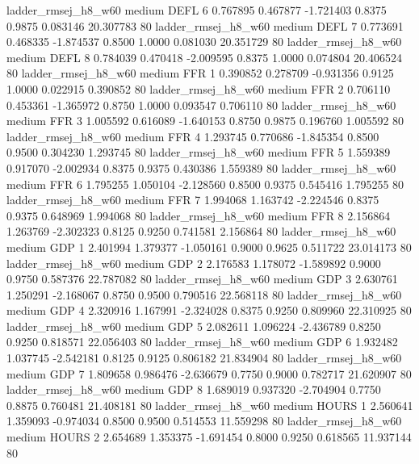    ladder_rmsej_h8_w60     medium     DEFL                 6  0.767895 0.467877 -1.721403 0.8375 0.9875  0.083146   20.307783 80
   ladder_rmsej_h8_w60     medium     DEFL                 7  0.773691 0.468335 -1.874537 0.8500 1.0000  0.081030   20.351729 80
   ladder_rmsej_h8_w60     medium     DEFL                 8  0.784039 0.470418 -2.009595 0.8375 1.0000  0.074804   20.406524 80
   ladder_rmsej_h8_w60     medium      FFR                 1  0.390852 0.278709 -0.931356 0.9125 1.0000  0.022915    0.390852 80
   ladder_rmsej_h8_w60     medium      FFR                 2  0.706110 0.453361 -1.365972 0.8750 1.0000  0.093547    0.706110 80
   ladder_rmsej_h8_w60     medium      FFR                 3  1.005592 0.616089 -1.640153 0.8750 0.9875  0.196760    1.005592 80
   ladder_rmsej_h8_w60     medium      FFR                 4  1.293745 0.770686 -1.845354 0.8500 0.9500  0.304230    1.293745 80
   ladder_rmsej_h8_w60     medium      FFR                 5  1.559389 0.917070 -2.002934 0.8375 0.9375  0.430386    1.559389 80
   ladder_rmsej_h8_w60     medium      FFR                 6  1.795255 1.050104 -2.128560 0.8500 0.9375  0.545416    1.795255 80
   ladder_rmsej_h8_w60     medium      FFR                 7  1.994068 1.163742 -2.224546 0.8375 0.9375  0.648969    1.994068 80
   ladder_rmsej_h8_w60     medium      FFR                 8  2.156864 1.263769 -2.302323 0.8125 0.9250  0.741581    2.156864 80
   ladder_rmsej_h8_w60     medium      GDP                 1  2.401994 1.379377 -1.050161 0.9000 0.9625  0.511722   23.014173 80
   ladder_rmsej_h8_w60     medium      GDP                 2  2.176583 1.178072 -1.589892 0.9000 0.9750  0.587376   22.787082 80
   ladder_rmsej_h8_w60     medium      GDP                 3  2.630761 1.250291 -2.168067 0.8750 0.9500  0.790516   22.568118 80
   ladder_rmsej_h8_w60     medium      GDP                 4  2.320916 1.167991 -2.324028 0.8375 0.9250  0.809960   22.310925 80
   ladder_rmsej_h8_w60     medium      GDP                 5  2.082611 1.096224 -2.436789 0.8250 0.9250  0.818571   22.056403 80
   ladder_rmsej_h8_w60     medium      GDP                 6  1.932482 1.037745 -2.542181 0.8125 0.9125  0.806182   21.834904 80
   ladder_rmsej_h8_w60     medium      GDP                 7  1.809658 0.986476 -2.636679 0.7750 0.9000  0.782717   21.620907 80
   ladder_rmsej_h8_w60     medium      GDP                 8  1.689019 0.937320 -2.704904 0.7750 0.8875  0.760481   21.408181 80
   ladder_rmsej_h8_w60     medium    HOURS                 1  2.560641 1.359093 -0.974034 0.8500 0.9500  0.514553   11.559298 80
   ladder_rmsej_h8_w60     medium    HOURS                 2  2.654689 1.353375 -1.691454 0.8000 0.9250  0.618565   11.937144 80
